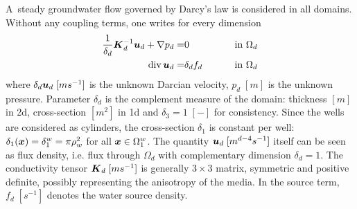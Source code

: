 A~steady groundwater flow governed by Darcy's law is considered in all domains.
Without any coupling terms, one writes for every dimension
\begin{eqnarray}
     \frac{1}{\delta_d} \mathbf{\boldsymbol{K}}_d^{-1} \mathbf{\boldsymbol{u}}_d + \nabla p_d =& 0  &\qquad \textrm{ in }\Omega_d\\
      {\rm div}\,\mathbf{\boldsymbol{u}}_d  =& \delta_d f_d  &\qquad \textrm{ in }\Omega_d
\end{eqnarray}
where $\delta_d\mathbf{\boldsymbol{u}}_d\; [ms^{-1}]$ is the unknown Darcian velocity, $p_d \; [m]$ is the unknown pressure.
Parameter $\delta_d$ is the complement measure of the domain: thickness $[m]$ in 2d,
cross-section $[m^2]$ in 1d and $\delta_3=1\; [-]$ for consistency. Since the wells are considered as cylinders,
the cross-section $\delta_1$ is constant per well: $\delta_1(\mathbf{\boldsymbol{x}})=\delta^w_1=\pi\rho^2_w$ for all $\mathbf{\boldsymbol{x}}\in \Omega^w_1$.
The quantity $\mathbf{\boldsymbol{u}}_d\; [m^{d-4}s^{-1}]$ itself can be seen as flux density, i.e. flux through $\Omega_d$
with complementary dimension $\delta_d=1$.
The conductivity tensor $\mathbf{\boldsymbol{K}}_d\; [ms^{-1}]$ is generally $3\times 3$ matrix,
symmetric and positive definite, possibly representing the anisotropy of the media.
In the source term, $f_d\;[s^{-1}]$ denotes the water source density.




